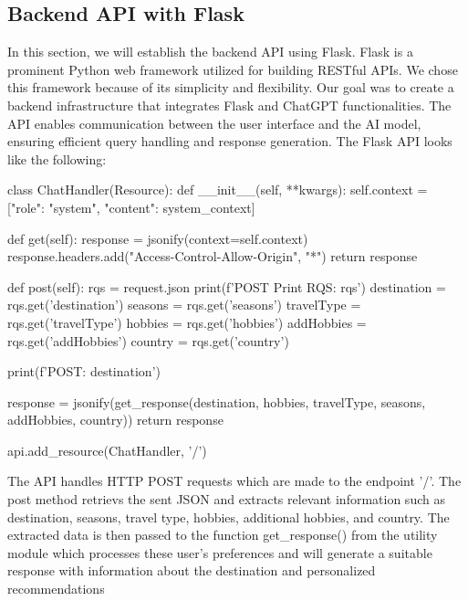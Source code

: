 \documentclass[english,notitlepage,smartquotes]{hgbreport}
\begin{document}
\subsection{Backend API with Flask}\label{Backend}
In this section, we will establish the backend API using Flask. Flask is a prominent Python web framework utilized for building RESTful APIs. We chose this framework because of its simplicity and flexibility. Our goal was to create a backend infrastructure that integrates Flask and ChatGPT functionalities. The API enables communication between the user interface and the AI model, ensuring efficient query handling and response generation. The Flask API looks like the following:
\begin{PythonCode}
	class ChatHandler(Resource):
	def __init__(self, **kwargs):
	self.context = [{"role": "system", "content": system_context}]
	
	def get(self):
	response = jsonify(context=self.context)
	response.headers.add("Access-Control-Allow-Origin", "*")
	return response
	
	def post(self):
	rqs = request.json
	print(f'POST Print RQS: {rqs}\n')
	destination = rqs.get('destination')
	seasons = rqs.get('seasons')
	travelType = rqs.get('travelType')
	hobbies = rqs.get('hobbies')
	addHobbies = rqs.get('addHobbies')
	country = rqs.get('country')
	
	print(f'POST: {destination}\n')
	
	response = jsonify(get_response(destination, hobbies, travelType, seasons, addHobbies, country))
	return response
	
	
	api.add_resource(ChatHandler, '/')
\end{PythonCode}
The API handles HTTP POST requests which are made to the endpoint '/'. The post method retrievs the sent JSON and extracts relevant information such as destination, seasons, travel type, hobbies, additional hobbies, and country. The extracted data is then passed to the function get\_response() from the utility module which processes these user's preferences and will generate a suitable response with information about the destination and personalized recommendations
\end{document}

